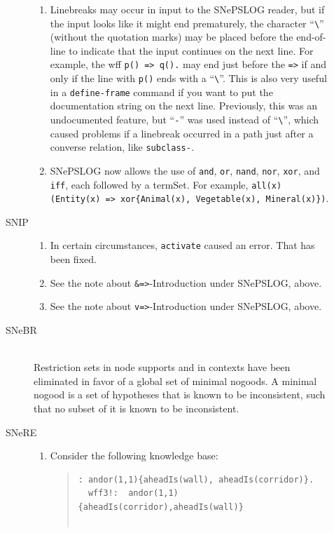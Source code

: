 \documentclass{book}
\begin{document}
\begin{description}
\begin{description}
\begin{enumerate}
            \item Linebreaks may occur in input to the SNePSLOG reader, but if
              the input looks like it might end prematurely, the character
              ``\verb.\.'' (without the quotation marks) may be placed before
                the end-of-line to indicate that the input continues on the next
                line.  For example, the wff \texttt{p() => q().} may end just
                before the \texttt{=>} if and only if the line with \texttt{p()}
                ends with a ``\verb.\.''.  This is also very useful in a
                  \texttt{define-frame} command if you want to put the
                  documentation string on the next line.  Previously, this was
                  an undocumented feature, but ``\texttt{-}'' was used instead
                  of ``\verb.\.'', which caused problems if a linebreak
                    occurred in a path just after a converse relation, like
                    \texttt{subclass-}.
                    
\item  SNePSLOG now allows the use of \texttt{and}, \texttt{or},
     \texttt{nand}, \texttt{nor}, \texttt{xor}, and
     \texttt{iff}, each followed by a termSet.  For example,
     \texttt{all(x)(Entity(x) => xor\{Animal(x), Vegetable(x),
     Mineral(x)\})}.
\end{enumerate}

\item[SNIP]\mbox{}
\begin{enumerate}

\item In certain circumstances, \texttt{activate} caused an error.
That has been fixed.

\item See the note about \texttt{\&=>}-Introduction under SNePSLOG, above.

\item  See the note about \texttt{v=>}-Introduction under SNePSLOG, above.
\end{enumerate}

\item[SNeBR]\mbox{}\\
Restriction sets in node supports and in contexts have been
eliminated in favor of a global set of minimal nogoods.  A minimal
nogood is a set of hypotheses that is known to be inconsistent, such
that no subset of it is known to be inconsistent.

\item[SNeRE]\mbox{}
\begin{enumerate}
\item  Consider the following knowledge base:
\begin{quote}
\begin{verbatim}
: andor(1,1){aheadIs(wall), aheadIs(corridor)}.
  wff3!:  andor(1,1){aheadIs(corridor),aheadIs(wall)}    


\end{verbatim}
\end{quote}
\end{enumerate}
\end{description}
\end{description}
\end{document}
